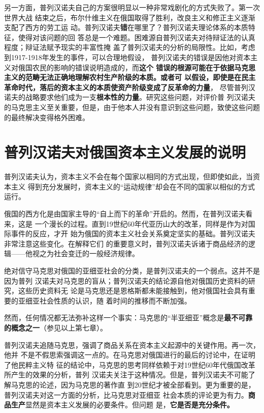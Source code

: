 另一方面，普列汉诺夫自己的方案很明显以一种非常戏剧化的方式失败了。第一次世界大战
结束之后，布尔什维主义在俄国取得了胜利，改良主义和修正主义逐渐支配了西方的劳工运
动。普列汉诺夫\textbf{错}在哪里了？普列汉诺夫理论体系的本质特征，使得对该问题的回
答总是一个难题。困难源自普列汉诺夫对待辩证法的认真程度；辩证法赋予现实的丰富性掩
盖了普列汉诺夫的分析的局限性。比如，考虑到1917-1918年发生的事件，可以合理地假设，
普列汉诺夫的错误是因他对资本主义对俄国农民的影响的错误说明造成的，而\textbf{这个
  错误的根源可能在于依据马克思主义的范畴无法正确地理解农村生产阶级的本质。或者可
  以假设，即使是在民主革命时代，落后的资本主义的本质使资产阶级变成了反革命的力量}，
尽管普列汉诺夫的战略要求他们成为一支\textbf{根本性的力量}。研究这些问题，对评价普
列汉诺夫的马克思主义至关重要，但是，由于他本人并没有意识到这些问题，致使这些问题
的最终解决变得格外困难。

\section{普列汉诺夫对俄国资本主义发展的说明}
普列汉诺夫认为，资本主义不会在每个国家以相同的方式出现，但即使如此，当资本主义
得到充分发展时，资本主义的“运动规律”却会在不同的国家以相似的方式运行。

俄国的西方化是由国家主导的“自上而下的革命”开启的。然而，在普列汉诺夫看来，这是
一个漫长的过程。直到19世纪60年代亚历山大的改革，同样是作为对国际事件的反应，才开
始为俄国的资本主义社会关系奠定坚实的基础。普列汉诺夫非常注意这些变化。在解释它们
的重要意义时，普列汉诺夫诉诸于商品经济的逻辑——他视之为社会变迁的一般经济规律。

绝对信守马克思对俄国的亚细亚社会的分类，是普列汉诺夫的一个弱点。这并不是因为普列
汉诺夫对马克思的盲从；普列汉诺夫的结论源自他对俄国历史资料的研究，这些历史资料无
论是马克思还是恩格斯都未能接触到，他对俄国社会具有重要的亚细亚社会性质的认识，随
着时间的推移而不断加强。

然而，任何情况都无法弥补这样一个事实：马克思的“半亚细亚”概念是\textbf{最不可靠
  的概念之一}（参见以上第七章）。

普列汉诺夫追随马克思，强调了商品关系在资本主义起源中的关键作用。再一次，他并
不是不假思索强调这一点的。在马克思对俄国进行的最后的讨论中，在证明了他民粹主义特
征的结论中，马克思的思考同样依赖于对19世纪60年代俄国改革所产生的效果的分析，普列
汉诺夫关注于这种情况。但是，普列汉诺夫不可能了解马克思的论述，因为马克思的著作直
到20世纪才被全部看到。更为重要的是，普列汉诺夫对这一方面的分析，比马克思对亚细亚
社会本质的评论更为有力。\textbf{商品生产}显然是资本主义发展的必要条件。但问题
是，\textbf{它是否是充分条件。}

